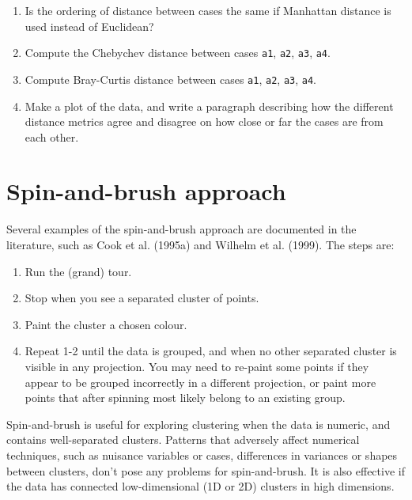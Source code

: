 \documentclass[
  letterpaper,
]{krantz}
\providecommand{\tightlist}{%
  \setlength{\itemsep}{0pt}\setlength{\parskip}{0pt}}\usepackage{longtable,booktabs,array}
\begin{document}
\begin{enumerate}
\def\labelenumi{\arabic{enumi}.}
\setcounter{enumi}{3}
\item
  Is the ordering of distance between cases the same if Manhattan
  distance is used instead of Euclidean?
\item
  Compute the Chebychev distance between cases \texttt{a1}, \texttt{a2},
  \texttt{a3}, \texttt{a4}.
\item
  Compute Bray-Curtis distance between cases \texttt{a1}, \texttt{a2},
  \texttt{a3}, \texttt{a4}.
\item
  Make a plot of the data, and write a paragraph describing how the
  different distance metrics agree and disagree on how close or far the
  cases are from each other.
\end{enumerate}

\hypertarget{sec-clust-graphics}{%
\chapter{Spin-and-brush approach}\label{sec-clust-graphics}}

 

Several examples of the spin-and-brush approach are documented in the
literature, such as Cook et al. (1995a) and Wilhelm et al. (1999). The
steps are:

\begin{enumerate}
\def\labelenumi{\arabic{enumi}.}
\tightlist
\item
  Run the (grand) tour.
\item
  Stop when you see a separated cluster of points.
\item
  Paint the cluster a chosen colour.
\item
  Repeat 1-2 until the data is grouped, and when no other separated
  cluster is visible in any projection. You may need to re-paint some
  points if they appear to be grouped incorrectly in a different
  projection, or paint more points that after spinning most likely
  belong to an existing group.
\end{enumerate}

Spin-and-brush is useful for exploring clustering when the data is
numeric, and contains well-separated clusters. Patterns that adversely
affect numerical techniques, such as nuisance variables or cases,
differences in variances or shapes between clusters, don't pose any
problems for spin-and-brush. It is also effective if the data has
connected low-dimensional (1D or 2D) clusters in high dimensions.
\end{document}
